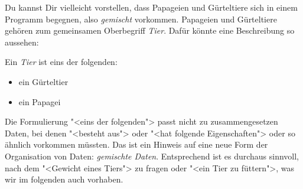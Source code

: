 Du kannst Dir vielleicht vorstellen, dass Papageien und
Gürteltiere sich in einem Programm begegnen, also \emph{gemischt}
vorkommen.  Papageien und Gürteltiere gehören zum gemeinsamen
Oberbegriff \textit{Tier}.  Dafür könnte eine
Beschreibung so aussehen:

\medskip

\noindent Ein \textit{Tier} ist eins der folgenden:
% 
\begin{itemize}
\item ein Gürteltier
\item ein Papagei
\end{itemize}
%
Die Formulierung "<eins der folgenden"> passt nicht zu
zusammengesetzen Daten, bei denen "<besteht aus"> oder "<hat folgende
Eigenschaften"> oder so ähnlich vorkommen müssten.
Das ist ein Hinweis auf
eine neue Form der Organisation von Daten: \textit{gemischte
  Daten}. Entsprechend ist es durchaus
sinnvoll, nach dem "<Gewicht eines Tiers"> zu fragen oder "<ein Tier
zu füttern">, was wir im folgenden auch vorhaben.

